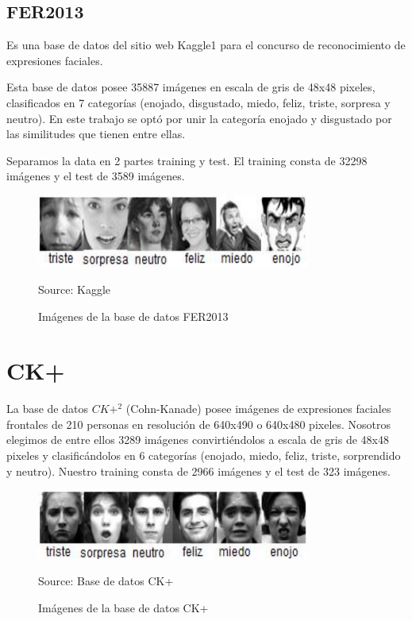 \subsection{FER2013}
Es una base de datos del sitio web Kaggle{1} para el concurso de reconocimiento de
expresiones faciales.

Esta base de datos posee 35887 imágenes en escala de gris de 48x48 pixeles,
clasificados en 7 categorías (enojado, disgustado, miedo, feliz, triste, sorpresa y neutro).
En este trabajo se optó por unir la categoría enojado y disgustado por las similitudes que
tienen entre ellas.

Separamos la data en 2 partes training y test. El training consta de 32298 imágenes
y el test de 3589 imágenes.

\begin{figure}[H]
		\centering
		\includegraphics[width=90mm]{./Imagenes/imagenes_fer.png}
		\caption{Imágenes de la base de datos FER2013}
		Source: Kaggle
		\label{fig:imagenes_fer}
\end{figure}

\section{CK+}
La base de datos $CK+^{2}$ (Cohn-Kanade) posee imágenes de expresiones faciales
frontales de 210 personas en resolución de 640x490 o 640x480 pixeles. Nosotros
elegimos de entre ellos 3289 imágenes convirtiéndolos a escala de gris de 48x48 pixeles
y clasificándolos en 6 categorías (enojado, miedo, feliz, triste, sorprendido y neutro).
Nuestro training consta de 2966 imágenes y el test de 323 imágenes.

\begin{figure}[H]
		\centering
		\includegraphics[width=90mm]{./Imagenes/imagenes_ck+.png}
		\caption{Imágenes de la base de datos CK+}
		Source: Base de datos CK+
		\label{fig:imagenes_ck+}
\end{figure}


